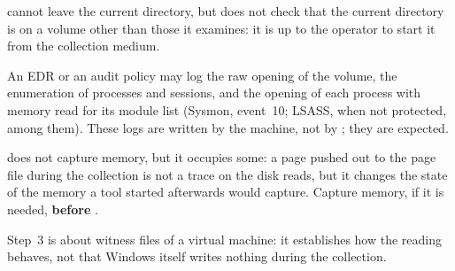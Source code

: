 \documentclass[11pt,a4paper,oneside]{report}
\begin{document}
\begin{description}[style=nextline,leftmargin=1.2em]
  \item[Output folder]  cannot leave the current directory, but
        \wac{} does not check that the current directory is on a volume other
        than those it examines: it is up to the operator to start it from the
        collection medium.
  \item[Monitoring] An EDR or an audit policy may log the raw opening of the
        volume, the enumeration of processes and sessions, and the opening of each
        process with memory read for its module list (Sysmon, event~10; LSASS,
        when not protected, among them). These logs are
        written by the machine, not by \wac{}; they are expected.
  \item[Memory] \wac{} does not capture memory, but it occupies some: a page
        pushed out to the page file during the collection is not a trace on
        the disk \wac{} reads, but it changes the state of the memory a tool
        started afterwards would capture. Capture memory, if it is needed,
        \textbf{before} \wac{}.
  \item[Measurement] Step~3 is about witness files of a virtual machine: it
        establishes how the reading behaves, not that Windows itself writes
        nothing during the collection.
\end{description}
\end{document}

